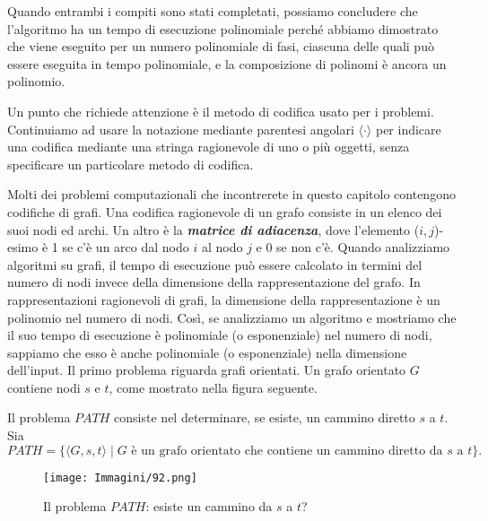 \documentclass{article}
\begin{document}
Quando entrambi i compiti sono stati completati, possiamo concludere che l'algoritmo ha un tempo di esecuzione polinomiale perché abbiamo dimostrato che viene eseguito per un numero polinomiale di fasi, ciascuna delle quali può essere eseguita in tempo polinomiale, e la composizione di polinomi è ancora un polinomio.

Un punto che richiede attenzione è il metodo di codifica usato per i problemi. 
Continuiamo ad usare la notazione mediante parentesi angolari $\langle \cdot \rangle$ per indicare una codifica mediante una stringa ragionevole di uno o più oggetti, senza specificare un particolare metodo di codifica.

Molti dei problemi computazionali che incontrerete in questo capitolo contengono codifiche di grafi.
Una codifica ragionevole di un grafo consiste in un elenco dei suoi nodi ed archi. 
Un altro è la \textit{\textbf{matrice di adiacenza}}, dove l'elemento ($i, j$)-esimo è 1 se c'è un arco dal nodo $i$ al nodo $j$ e 0 se non c'è.
Quando analizziamo algoritmi su grafi, il tempo di esecuzione può essere calcolato in termini del numero di nodi invece della dimensione della rappresentazione del grafo.
In rappresentazioni ragionevoli di grafi, la dimensione della rappresentazione è un polinomio nel numero di nodi.
Così, se analizziamo un algoritmo e mostriamo che il suo tempo di esecuzione è polinomiale (o esponenziale) nel numero di nodi, sappiamo che esso è anche polinomiale (o esponenziale) nella dimensione dell'input.
Il primo problema riguarda grafi orientati. 
Un grafo orientato $G$ contiene nodi $s$ e $t$, come mostrato nella figura seguente. 

Il problema $PATH$ consiste nel determinare, se esiste, un cammino diretto $s$ a $t$. Sia
$$
PATH = \{ \langle G, s, t \rangle \mid G \text{ è un grafo orientato che contiene un cammino diretto da } s \text{ a } t \}.
$$
\begin{figure}[H]
    \centering
    \texttt{[image: Immagini/92.png]}
    \caption{Il problema $PATH$: esiste un cammino da $s$ a $t$?}
    \label{fig:directed_graph}
\end{figure}
\end{document}
